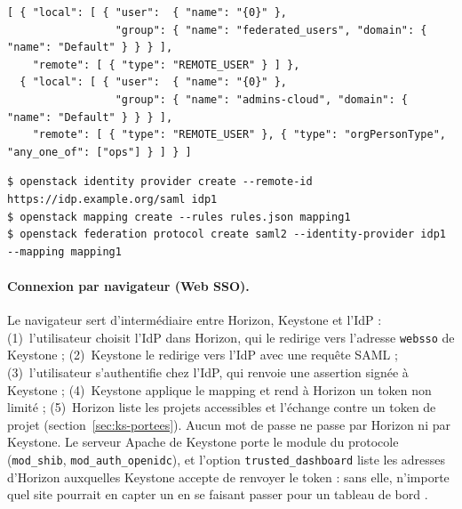 \par\noindent\begin{minipage}{\linewidth}
\begin{lstlisting}
[ { "local": [ { "user":  { "name": "{0}" },
                 "group": { "name": "federated_users", "domain": { "name": "Default" } } } ],
    "remote": [ { "type": "REMOTE_USER" } ] },
  { "local": [ { "user":  { "name": "{0}" },
                 "group": { "name": "admins-cloud", "domain": { "name": "Default" } } } ],
    "remote": [ { "type": "REMOTE_USER" }, { "type": "orgPersonType", "any_one_of": ["ops"] } ] } ]
\end{lstlisting}
\end{minipage}\par

\par\noindent\begin{minipage}{\linewidth}
\begin{lstlisting}[style=terminal]
$ openstack identity provider create --remote-id https://idp.example.org/saml idp1
$ openstack mapping create --rules rules.json mapping1
$ openstack federation protocol create saml2 --identity-provider idp1 --mapping mapping1
\end{lstlisting}
\end{minipage}\par

\paragraph{Connexion par navigateur (Web SSO).} Le navigateur sert d'intermédiaire entre Horizon, Keystone et l'IdP
\parencite{keystone-federation} : (1)~l'utilisateur choisit l'IdP dans Horizon, qui le redirige vers l'adresse \texttt{websso} de
Keystone ; (2)~Keystone le redirige vers l'IdP avec une requête SAML ; (3)~l'utilisateur s'authentifie chez l'IdP, qui renvoie une
assertion signée à Keystone ; (4)~Keystone applique le mapping et rend à Horizon un token non limité ; (5)~Horizon liste les projets
accessibles et l'échange contre un token de projet (section~\ref{sec:ks-portees}). Aucun mot de passe ne passe par Horizon ni par
Keystone. Le serveur Apache de Keystone porte le module du protocole (\texttt{mod\_shib}, \texttt{mod\_auth\_openidc}), et l'option
\texttt{trusted\_dashboard} liste les adresses d'Horizon auxquelles Keystone accepte de renvoyer le token : sans elle, n'importe quel
site pourrait en capter un en se faisant passer pour un tableau de bord \parencite{keystone-federation-config}.


